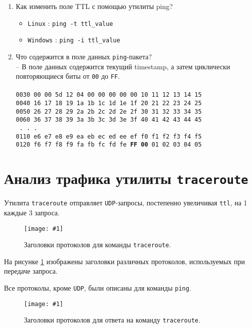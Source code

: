\documentclass[12pt, a4paper]{article}
\newcommand{\figc}[4]{
  \begin{figure}[H]
  \begin{center}
    \texttt{[image: \#1]}
    \caption{#2}
    \label{fig:#3}
  \end{center}
  \end{figure}
}
\begin{document}
\begin{enumerate}
  \item Как изменить поле TTL с помощью утилиты ping?\\
    \begin{itemize}
      \item \texttt{Linux} : \texttt{ping -t ttl\_value}
      \item \texttt{Windows} : \texttt{ping -i ttl\_value}
    \end{itemize}
  \item Что содержится в поле данных \texttt{ping}-пакета?\\
    -- В поле данных содержится текущий timestamp, а затем циклически
    повторяющиеся биты от \texttt{00} до \texttt{FF}.\\ \\
    \texttt{0030   00 00 5d 12 04 00 00 00 00 00 10 11 12 13 14 15}\\
    \texttt{0040   16 17 18 19 1a 1b 1c 1d 1e 1f 20 21 22 23 24 25}\\
    \texttt{0050   26 27 28 29 2a 2b 2c 2d 2e 2f 30 31 32 33 34 35}\\
    \texttt{0060   36 37 38 39 3a 3b 3c 3d 3e 3f 40 41 42 43 44 45}\\
    \texttt{                    .       .       .                 }\\
    \texttt{0110   e6 e7 e8 e9 ea eb ec ed ee ef f0 f1 f2 f3 f4 f5}\\
    \texttt{0120   f6 f7 f8 f9 fa fb fc fd fe \textbf{FF 00} 01 02 03 04 05}\\
\end{enumerate}

\section{Анализ трафика утилиты \texttt{traceroute}}

Утилита \texttt{traceroute} отправляет \texttt{UDP}-запросы, постепенно увеличивая
\texttt{ttl}, на 1 каждые 3 запроса.

\figc{trace_headers}{Заголовки протоколов для команды \texttt{traceroute}.}{t_f}{3.0}

На рисунке \ref{fig:t_f} изображены заголовки различных протоколов, используемых при
передаче запроса.

Все протоколы, кроме \texttt{UDP}, были описаны для команды \texttt{ping}.

\figc{trace_ans_headers}{Заголовки протоколов для ответа на команду \texttt{traceroute}.}{t_f_a}{3.0}
\end{document}
